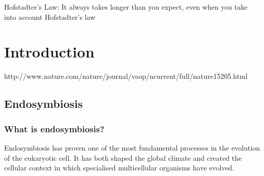 \graphicspath{{chapters/1.Introduction/figures/}}

\begin{savequote}[75mm]
Hofstadter's Law: It always takes longer than you expect, even when you take into account Hofstadter's law
\end{savequote}

\chapter{Introduction}

http://www.nature.com/nature/journal/vaop/ncurrent/full/nature15205.html

\section{Endosymbiosis}




\subsection{What is endosymbiosis?}

Endosymbiosis has proven one of the most fundamental processes in the evolution of the
eukaryotic cell. It has both shaped the global climate and
created the cellular context in which specialised multicellular organisms have evolved.

